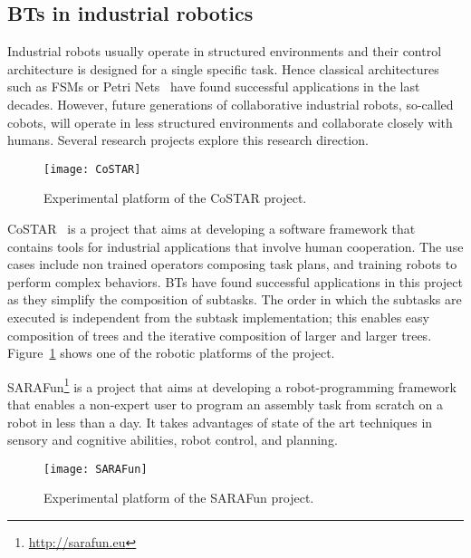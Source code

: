 \subsection{BTs in industrial robotics}
Industrial robots usually operate in structured environments and their  control architecture  is designed for a single specific task. Hence classical architectures such as FSMs or Petri Nets~\cite{murata1989petri} have found successful applications in the last decades. However, future generations of collaborative industrial robots, so-called cobots, will operate in less structured environments and  collaborate closely with humans. Several research projects explore this research direction. 

\begin{figure}[h]
\centering
\texttt{[image: CoSTAR]}
\caption[Experimental platform of the CoSTAR project.]{Experimental platform of the CoSTAR project.\footnotemark}
\label{bts.fig.CoSTAR}
\end{figure}

CoSTAR~\cite{paxton2016costar} is a project that aims at developing a software framework that contains tools for  industrial applications that involve human cooperation. The use cases include non trained operators composing task plans, and training 
 robots  to perform complex behaviors.
BTs have found successful applications in this project as they simplify the composition of subtasks. The order in which the subtasks are executed is independent from the subtask implementation; this enables  easy composition of trees and the iterative composition of larger and larger trees. Figure~\ref{bts.fig.CoSTAR} shows one of the robotic platforms of the project.



SARAFun\footnote{\url{http://sarafun.eu}} is a project that aims at developing a robot-programming framework that enables a non-expert user to program an assembly task from scratch on a robot in less than a day. It takes advantages of state of the art techniques in sensory and cognitive abilities, robot control, and planning.
\begin{figure}[h]
\centering
\texttt{[image: SARAFun]}%

\caption[Experimental platform of the SARAFun projectE.]{Experimental platform of the SARAFun project.\footnotemark}
\label{bts.fig.SARAFun}
\end{figure}

